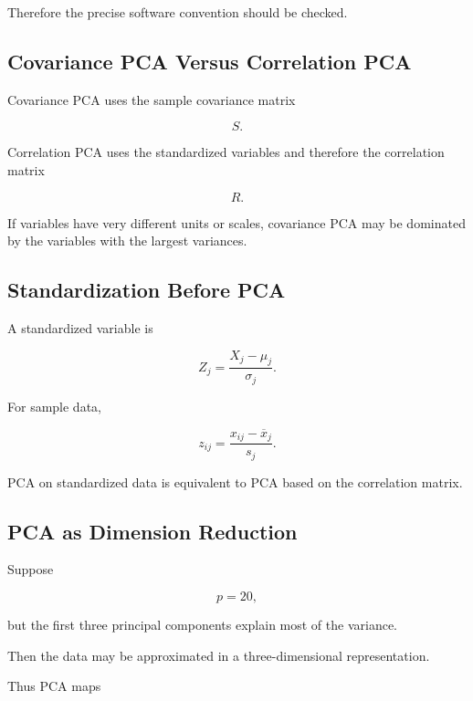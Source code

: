 Therefore the precise software convention should be checked.

\subsection{Covariance PCA Versus Correlation PCA}
\label{subsec:covariance-versus-correlation-pca}

Covariance PCA uses the sample covariance matrix

\[
S.
\]

Correlation PCA uses the standardized variables and therefore the
correlation matrix

\[
R.
\]

If variables have very different units or scales, covariance PCA may be
dominated by the variables with the largest variances.

\subsection{Standardization Before PCA}
\label{subsec:standardization-before-pca}

A standardized variable is

\[
\boxed{
Z_j
=
\frac{
X_j-\mu_j
}{
\sigma_j
}.
}
\]

For sample data,

\[
\boxed{
z_{ij}
=
\frac{
x_{ij}-\overline{x}_j
}{
s_j
}.
}
\]

PCA on standardized data is equivalent to PCA based on the correlation
matrix.

\subsection{PCA as Dimension Reduction}
\label{subsec:pca-dimension-reduction}

Suppose

\[
p=20,
\]

but the first three principal components explain most of the variance.

Then the data may be approximated in a three-dimensional representation.

Thus PCA maps


